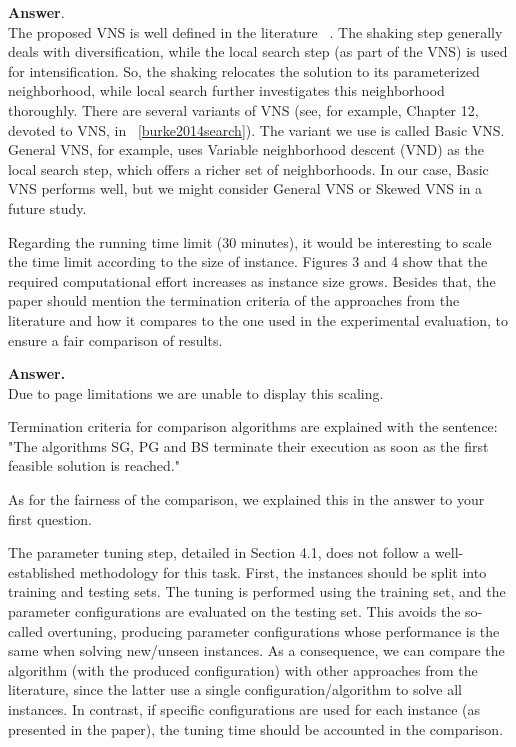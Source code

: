 \documentclass [11pt]{scrartcl}
\begin{document}
	\textbf{Answer}. \\
	The proposed VNS is well defined in the literature ~\cite{mladenovic1997variable}. 
	The shaking step generally deals with diversification, while the local search step (as part of the VNS) is used for intensification. So, the shaking relocates the solution to its parameterized neighborhood, while local search further investigates this neighborhood thoroughly. 
	There are several variants of VNS (see, for example, Chapter 12, devoted to VNS, in ~\ref{burke2014search}). The variant we use is called Basic VNS. General VNS, for example, uses Variable neighborhood descent (VND) as the local search step, which offers a richer set of neighborhoods. 
	In our case, Basic VNS performs well, but we might consider General VNS or Skewed VNS in a future study. 

\begin{leftbar}
Regarding the running time limit (30 minutes), it would be interesting to scale the time limit according to the size of instance. Figures 3 and 4 show that the required computational effort increases as instance size grows. Besides that, the paper should mention the termination criteria of the approaches from the literature and how it compares to the one used in the experimental evaluation, to ensure a fair comparison of results.	
\end{leftbar}

\textbf{Answer.}\\ 
Due to page limitations we are unable to display this scaling. 

Termination criteria for comparison algorithms are explained with the sentence:
"The algorithms SG, PG and BS terminate their execution as soon as the first feasible solution is reached."

As for the fairness of the comparison, we explained this in the answer to your first question.

\begin{leftbar}
The parameter tuning step, detailed in Section 4.1, does not follow a well-established methodology for this task. First, the instances should be split into training and testing sets. The tuning is performed using the training set, and the parameter configurations are evaluated on the testing set. This avoids the so-called overtuning, producing parameter configurations whose performance is the same when solving new/unseen instances. As a consequence, we can compare the algorithm (with the produced configuration) with other approaches from the literature, since the latter use a single configuration/algorithm to solve all instances. In contrast, if specific configurations are used for each instance (as presented in the paper), the tuning time should be accounted in the comparison.
	
\end{leftbar}
\end{document}
